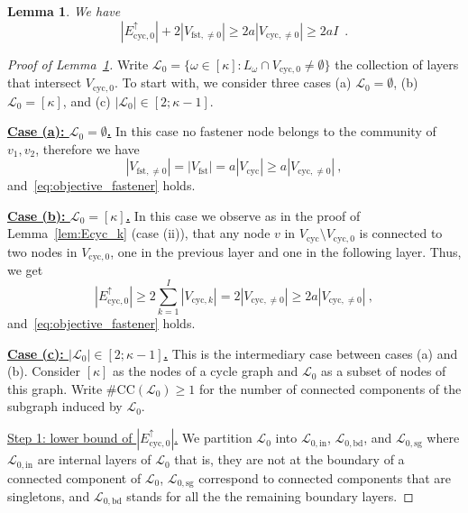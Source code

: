 \documentclass[10pt,a4paper]{amsart}
\newtheorem{lemma}{Lemma}
\begin{document}
\begin{lemma}\label{lem:eq:out_0}
    We have 
 \begin{equation}\label{eq:objective_fastener}
|E_{\mathrm{cyc},0}^{\uparrow}|+ 2 |V_{\mathrm{fst},\neq 0}| \geq 2 a |V_{\mathrm{cyc},\neq 0}| \geq 2a I\enspace . 
\end{equation}
\end{lemma}

\begin{proof}[Proof of Lemma~\ref{lem:eq:out_0}]


Write $\mathcal{L}_0= \{\omega\in [\kappa]: L_{\omega}\cap V_{\mathrm{cyc},0}\neq \emptyset\}$ the collection of layers that intersect $V_{\mathrm{cyc},0}$. To start with, we consider three cases (a) $\mathcal{L}_0=\emptyset$, (b) $\mathcal{L}_0=[\kappa]$, and (c) $|\mathcal{L}_0|\in [2;\kappa-1]$.

\noindent
\underline{\bf Case (a): $\mathcal{L}_0=\emptyset$.} In this case no fastener node belongs to the community of $v_1, v_2$, therefore we have 
\[
|V_{\mathrm{fst},\neq 0}|=  |V_{\mathrm{fst}}|= a |V_{\mathrm{cyc}}|\geq a  |V_{\mathrm{cyc},\neq 0}| \ , 
\]
and~\eqref{eq:objective_fastener} holds. 


\medskip 

\noindent
\underline{\bf Case (b): $\mathcal{L}_0=[\kappa]$.} In this case we observe as in the proof of Lemma~\ref{lem:Ecyc_k} (case (ii)), that any node $v$ in $V_{\mathrm{cyc}}\setminus V_{\mathrm{cyc},0}$ is connected to two nodes in $V_{\mathrm{cyc},0}$, one in the previous layer and one in the following layer. Thus, we get 
\[
|E_{\mathrm{cyc},0}^{\uparrow}|\geq 2 \sum_{k=1}^I |V_{\mathrm{cyc},k}| =  2|V_{\mathrm{cyc},\neq 0}| \geq 2a|V_{\mathrm{cyc},\neq 0}|\ , 
\]
and~\eqref{eq:objective_fastener} holds. 



\medskip 

\noindent
\underline{\bf Case (c): $|\mathcal{L}_0|\in [2;\kappa-1]$.} This is the intermediary case between cases (a) and (b). Consider $[\kappa]$ as the nodes of a cycle graph and $\mathcal{L}_0$ as a subset of nodes of this graph. Write $\#\mathrm{CC}(\mathcal L_0)\geq 1$ for the number of connected components of the subgraph induced by $\mathcal{L}_0$. 
\smallskip

\noindent
\underline{Step 1: lower bound of $|E_{\mathrm{cyc},0}^{\uparrow}|$.} We partition $\mathcal{L}_0$ into $\mathcal{L}_{0,\mathrm{in}}$, $\mathcal{L}_{0,\mathrm{bd}}$, and $\mathcal{L}_{0,\mathrm{sg}}$ where $\mathcal{L}_{0,\mathrm{in}}$ are internal layers of $\mathcal{L}_0$ that is, they are not at the boundary of a connected component of $\mathcal{L}_0$, $\mathcal{L}_{0,\mathrm{sg}}$ correspond to connected components that are singletons, and $\mathcal{L}_{0,\mathrm{bd}}$ stands for all the the remaining boundary layers. 


\end{proof}
\end{document}
